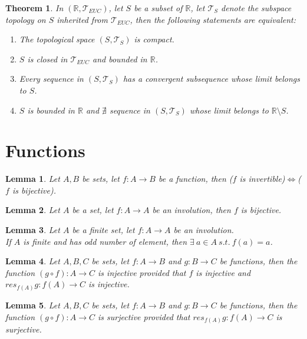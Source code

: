 \documentclass[11pt]{article}
\theoremstyle{break}
\theoremstyle{break}
\newtheorem{thm}{Theorem}[section]
\newtheorem{lem}{Lemma}[thm]
\newcommand{\R}{\mathbb{R}}
\newcommand{\T}{\mathcal{T}}
\begin{document}
	\begin{thm}
		In $(\R, \T_{EUC})$, let $S$ be a subset of $\R$, let $\T_S$ denote the subspace topology on $S$ inherited from $\T_{EUC}$, then the following statements are equivalent:
		\begin{enumerate}[topsep=3pt,itemsep=-1ex,partopsep=1ex,parsep=1ex]
			\item The topological space $(S,\T_S)$ is compact.
			\item $S$ is closed in $\T_{EUC}$ and bounded in $\R$.
			\item Every sequence in $(S,\T_S)$ has a convergent subsequence whose limit belongs to $S$.
			\item $S$ is bounded in $\R$ and $\nexists$ sequence in $(S,\T_S)$ whose limit belongs to $\R \setminus S$.
		\end{enumerate}
	\end{thm}
	
\clearpage
	
	
	
	
	
	
	
	
	
\section{\color{red} Functions}

	\begin{lem}
  		Let $A,B$ be sets, let $f:A \to B$ be a function, then ($f$ is invertible)$\iff$($f$ is bijective).
	\end{lem}
	
	\begin{lem}
		Let $A$ be a set, let $f:A \to A$ be an involution, then $f$ is bijective.
	\end{lem}
	
	\begin{lem}
		Let $A$ be a finite set, let $f:A \to A$ be an involution.\\ If $A$ is finite and has odd number of element, then $\exists \ a \in A \ s.t. \ f(a)=a$.
	\end{lem}
	
	\begin{lem}
		Let $A,B,C$ be sets, let $f:A \to B$ and $g:B \to C$ be functions, then the function $(g \circ f): A \to C$ is injective provided that $f$ is injective and $res_{f(A)}g:f(A) \to C$ is injective.
	\end{lem}
	
	\begin{lem}
		Let $A,B,C$ be sets, let $f:A \to B$ and $g:B \to C$ be functions, then the function $(g \circ f): A \to C$ is surjective provided that $res_{f(A)}g:f(A) \to C$ is surjective.
	\end{lem}
	
\end{document}
